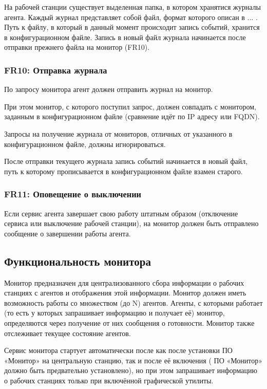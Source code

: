 На рабочей станции существует выделенная папка, в котором хранятися журналы агента. Каждый журнал представляет собой файл, формат которого описан в ... . Путь к файлу, в который в данный момент происходит запись событий, хранится в конфигурационном файле. Запись в новый файл журнала начинается после отправки прежнего файла на монитор (FR10).

\subsubsection{FR10: Отправка журнала}

По запросу монитора агент должен отправить журнал на монитор. 

При этом монитор, с которого поступил запрос, должен совпадать с монитором, заданным в конфигурационном файле (сравнение идёт по IP адресу или FQDN).

Запросы на получение журнала от мониторов, отличных от указанного в конфигурационном файле, должны игнорироваться.

После отправки текущего журнала запись событий начинается в новый файл, путь к которому прописывается в конфигурационном файле взамен старого.

\subsubsection{FR11: Оповещение о выключении}

Если сервис агента завершает свою работу штатным образом (отключение сервиса или выключение рабочей станции), на монитор должен быть отправлено сообщение о завершении работы агента.

\subsection{Функциональность монитора}

Монитор предназначен для централизованного сбора информации о рабочих станциях с агентов и отображения этой информации. Монитор должен иметь возможность работы со множеством (до N) агентов.
Агенты, с которыми работает (то есть у которых запрашивает информацию и получает её) монитор, определяются через получение от них сообщения о готовности. Монитор также отслеживает текущее состояние агентов.

Сервис монитора стартует автоматически после как после установки ПО «Монитор» на центральную станцию, так и после её включения ( ПО «Монитор» должно быть предвательно установлено), но при этом запрашивает информацию о рабочих станциях только при включённой графической утилиты.


